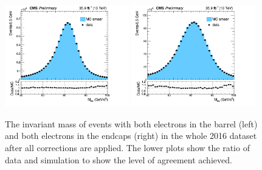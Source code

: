 \begin{figure}[htbp]
  \begin{center}
    \includegraphics[width=0.48\textwidth]{simulation/EBEBInvMass2016.png}
    \includegraphics[width=0.48\textwidth]{simulation/EEEEInvMass2016.png}
    \caption[Comparison of data and simulation in {\epem} events around the {\PZ} resonance]{
        The invariant mass of {\epem} events with both electrons in the barrel (left) and both electrons in the endcaps (right) in the whole 2016 dataset after all corrections are applied.
        The lower plots show the ratio of data and simulation to show the level of agreement achieved.
      }\label{fig:dataMCRatio}
  \end{center}
\end{figure}
